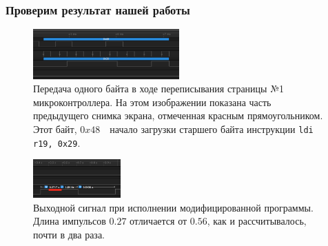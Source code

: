 \documentclass[aspectratio=169, pdf, 8pt, unicode]{beamer}
\begin{document}
\begin{frame}[fragile]
\frametitle{Проверим результат нашей работы}
	\vspace*{0.5cm}
	\begin{figure}[H]
		\centering
		\vspace*{-0.5cm}
		\includegraphics[width=0.5\textwidth]{resources/logic_reprogramming_closeup.png}
		\caption{Передача одного байта в ходе переписывания страницы №1 микроконтроллера. На этом изображении показана
		         часть предыдущего снимка экрана, отмеченная красным прямоугольником. Этот байт, $0x48$\ \cyrdash\ начало
			 загрузки старшего байта инструкции \texttt{ldi r19, 0x29}.  }
	\end{figure}
	\begin{figure}[H]
		\centering
		\vspace*{-0.5cm}
		\includegraphics[width=0.3\textwidth]{resources/logic_reprogrammed.png}
		\caption{Выходной сигнал при исполнении модифицированной программы. Длина импульсов $0.27$ отличается от
			$0.56$, как и рассчитывалось, почти в два раза.}
	\end{figure}
\end{frame}
\end{document}
